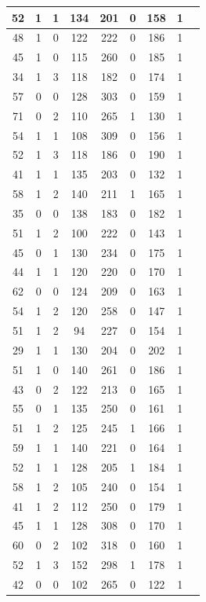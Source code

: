 \documentclass{article}
\begin{document}
\begin{longtable}{
|
c|c|c|c|c|c|c|c|c|}
\hline
52 & 1 & 1 & 134 & 201 & 0 & 158 & 1 \\
\hline
48 & 1 & 0 & 122 & 222 & 0 & 186 & 1 \\
\hline
45 & 1 & 0 & 115 & 260 & 0 & 185 & 1 \\
\hline
34 & 1 & 3 & 118 & 182 & 0 & 174 & 1 \\
\hline
57 & 0 & 0 & 128 & 303 & 0 & 159 & 1 \\
\hline
71 & 0 & 2 & 110 & 265 & 1 & 130 & 1 \\
\hline
54 & 1 & 1 & 108 & 309 & 0 & 156 & 1 \\
\hline
52 & 1 & 3 & 118 & 186 & 0 & 190 & 1 \\
\hline
41 & 1 & 1 & 135 & 203 & 0 & 132 & 1 \\
\hline
58 & 1 & 2 & 140 & 211 & 1 & 165 & 1 \\
\hline
35 & 0 & 0 & 138 & 183 & 0 & 182 & 1 \\
\hline
51 & 1 & 2 & 100 & 222 & 0 & 143 & 1 \\
\hline
45 & 0 & 1 & 130 & 234 & 0 & 175 & 1 \\
\hline
44 & 1 & 1 & 120 & 220 & 0 & 170 & 1 \\
\hline
62 & 0 & 0 & 124 & 209 & 0 & 163 & 1 \\
\hline
54 & 1 & 2 & 120 & 258 & 0 & 147 & 1 \\
\hline
51 & 1 & 2 & 94 & 227 & 0 & 154 & 1 \\
\hline
29 & 1 & 1 & 130 & 204 & 0 & 202 & 1 \\
\hline
51 & 1 & 0 & 140 & 261 & 0 & 186 & 1 \\
\hline
43 & 0 & 2 & 122 & 213 & 0 & 165 & 1 \\
\hline
55 & 0 & 1 & 135 & 250 & 0 & 161 & 1 \\
\hline
51 & 1 & 2 & 125 & 245 & 1 & 166 & 1 \\
\hline
59 & 1 & 1 & 140 & 221 & 0 & 164 & 1 \\
\hline
52 & 1 & 1 & 128 & 205 & 1 & 184 & 1 \\
\hline
58 & 1 & 2 & 105 & 240 & 0 & 154 & 1 \\
\hline
41 & 1 & 2 & 112 & 250 & 0 & 179 & 1 \\
\hline
45 & 1 & 1 & 128 & 308 & 0 & 170 & 1 \\
\hline
60 & 0 & 2 & 102 & 318 & 0 & 160 & 1 \\
\hline
52 & 1 & 3 & 152 & 298 & 1 & 178 & 1 \\
\hline
42 & 0 & 0 & 102 & 265 & 0 & 122 & 1 \\

\end{longtable}
\end{document}
